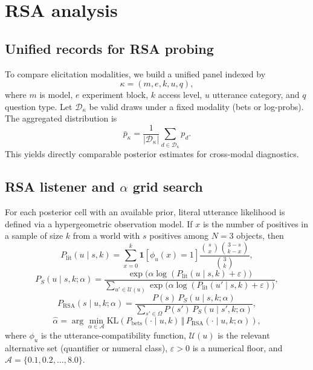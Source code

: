 \documentclass[11pt]{article}
\begin{document}
\section{RSA analysis}

\subsection{Unified records for RSA probing}

To compare elicitation modalities, we build a unified panel indexed by
\[
\kappa=(m,e,k,u,q),
\]
where $m$ is model, $e$ experiment block, $k$ access level, $u$ utterance category, and $q$ question type. Let $\mathcal{D}_\kappa$ be valid draws under a fixed modality (bets or log-probs). The aggregated distribution is
\[
\bar p_\kappa=\frac{1}{|\mathcal{D}_\kappa|}\sum_{d\in\mathcal{D}_\kappa}p_d.
\]
This yields directly comparable posterior estimates for cross-modal diagnostics.



\subsection{RSA listener and $\alpha$ grid search}

For each posterior cell with an available prior, literal utterance likelihood is defined via a hypergeometric observation model. If $x$ is the number of positives in a sample of size $k$ from a world with $s$ positives among $N=3$ objects, then
{\setlength{\abovedisplayskip}{5pt}\setlength{\belowdisplayskip}{5pt}\setlength{\abovedisplayshortskip}{4pt}\setlength{\belowdisplayshortskip}{4pt}\small
\begin{equation}
\label{eq:plithg}
P_{\mathrm{lit}}(u\mid s,k)=
\sum_{x=0}^{k}\mathbf{1}\!\left[\phi_u(x)=1\right]
\frac{\binom{s}{x}\binom{3-s}{k-x}}{\binom{3}{k}},
\end{equation}
\begin{equation}
\label{eq:speaker}
P_S(u\mid s,k;\alpha)=
\frac{\exp\!\big(\alpha\log(P_{\mathrm{lit}}(u\mid s,k)+\varepsilon)\big)}
{\sum_{u'\in\mathcal{U}(u)}\exp\!\big(\alpha\log(P_{\mathrm{lit}}(u'\mid s,k)+\varepsilon)\big)},
\end{equation}
\begin{equation}
\label{eq:listener}
P_{\mathrm{RSA}}(s\mid u,k;\alpha)=
\frac{P(s)\,P_S(u\mid s,k;\alpha)}
{\sum_{s'\in\Omega}P(s')\,P_S(u\mid s',k;\alpha)},
\end{equation}
\begin{equation}
\label{eq:alphaobj}
\hat\alpha=\arg\min_{\alpha\in\mathcal{A}}
\mathrm{KL}\!\left(P_{\mathrm{bets}}(\cdot\mid u,k)\,\Vert\,
P_{\mathrm{RSA}}(\cdot\mid u,k;\alpha)\right),
\end{equation}
\normalsize}
where $\phi_u$ is the utterance-compatibility function, $\mathcal{U}(u)$ is the relevant alternative set (quantifier or numeral class), $\varepsilon>0$ is a numerical floor, and $\mathcal{A}=\{0.1,0.2,\dots,8.0\}$.
\end{document}
